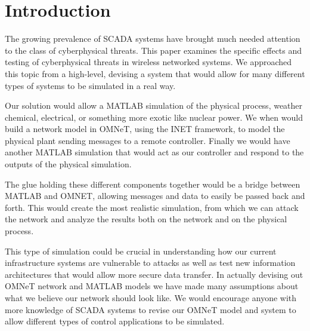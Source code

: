 \section{Introduction}
The growing prevalence of SCADA systems have brought much needed attention to the class of cyberphysical threats.  This paper examines the specific effects and testing of cyberphysical threats in wireless networked systems. We approached this topic from a high-level, devising a system that would allow for many different types of systems to be simulated in a real way. 

Our solution would allow a MATLAB simulation of the physical process, weather chemical, electrical, or something more exotic like nuclear power. We when would build a network model in OMNeT, using the INET framework, to model the physical plant sending messages to a remote controller. Finally we would have another MATLAB simulation that would act as our controller and respond to the outputs of the physical simulation. 

The glue holding these different components together would be a bridge between MATLAB and OMNET, allowing messages and data to easily be passed back and forth. This would create the most realistic simulation, from which we can attack the network and analyze the results both on the network and on the physical process. 

This type of simulation could be crucial in understanding how our current infrastructure systems are vulnerable to attacks as well as test new information architectures that would allow more secure data transfer. In actually devising out OMNeT network and MATLAB models we have made many assumptions about what we believe our network should look like. We would encourage anyone with more knowledge of SCADA systems to revise our OMNeT model and system to allow different types of control applications to be simulated.  

